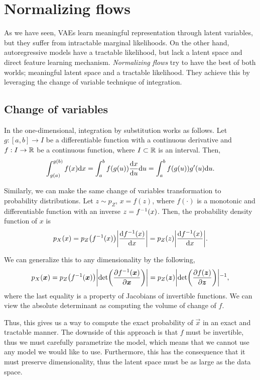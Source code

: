 \section{Normalizing flows}

As we have seen, VAEs learn meaningful representation through latent variables, but they suffer
from intractable marginal likelihoods. On the other hand, autoregressive models have a tractable
likelihood, but lack a latent space and direct feature learning mechanism. \textit{Normalizing
    flows} \citep{rezende2015variational} try to have the best of both worlds; meaningful latent space
and a tractable likelihood. They achieve this by leveraging the change of variable technique of
integration.

\subsection{Change of variables}

In the one-dimensional, integration by substitution works as follows. Let $g: [a,b] \to I$ be a
differentiable function with a continuous derivative and $f: I \to \mathbb{R}$ be a continuous function,
where $I \subset \mathbb{R}$ is an interval. Then, \[
    \int_{g(a)}^{g(b)} f(x)\mathrm{d}x = \int_a^b f(g(u)) \odv{x}{u} \mathrm{d}u = \int_a^b f(g(u)) g'(u) \mathrm{d}u.
\]

Similarly, we can make the same change of variables transformation to probability distributions.
Let $z \sim p_Z$, $x = f(z)$, where $f(\cdot)$ is a monotonic and differentiable function with an
inverse $z = f^{-1}(x)$. Then, the probability density function of $x$ is \[
    p_X(x) = p_Z\lft(\inv{f}(x)\rgt) \lft|\odv{\inv{f}(x)}{x}\rgt| = p_Z(z) \lft|\odv{\inv{f}(x)}{x}\rgt|.
\]

We can generalize this to any dimensionality by the following, \[
    p_X(\vec{x}) = p_Z \lft( \inv{f}(\vec{x}) \rgt) \lft| \det{\pdv{\inv{f}(\vec{x})}{\vec{x}}} \rgt| = p_Z(\vec{z}) \inv{\lft| \det{\pdv{f(\vec{z})}{\vec{z}}} \rgt|},
\]
where the last equality is a property of Jacobians of invertible functions. We can view the
absolute determinant as computing the volume of change of $f$.

Thus, this gives us a way to compute the exact probability of $\vec{x}$ in an exact and tractable
manner. The downside of this approach is that $f$ must be invertible, thus we must carefully
parametrize the model, which means that we cannot use any model we would like to use. Furthermore,
this has the consequence that it must preserve dimensionality, thus the latent space must be as
large as the data space.

